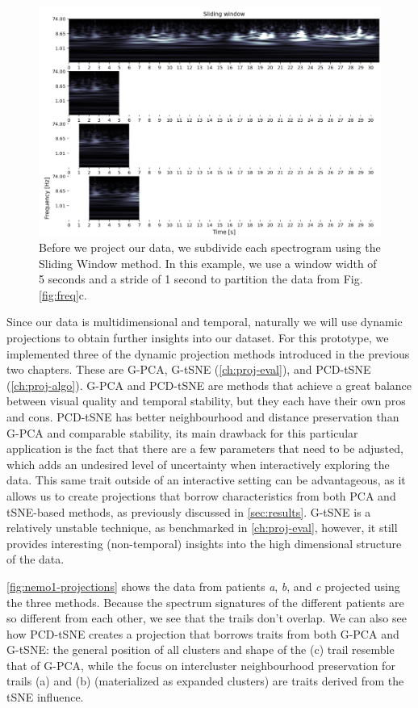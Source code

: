 \begin{figure}[ht]
\centering
\includegraphics[width=\linewidth]{figures/nemo/sliding.png}
\caption{Before we project our data, we subdivide each spectrogram using the Sliding Window method. In this example, we use a window width of 5 seconds and a stride of 1 second to partition the data from Fig. \ref{fig:freq}c.}
\label{fig:sliding}
\end{figure}

Since our data is multidimensional and temporal, naturally we will use dynamic projections to obtain further insights into our dataset.
For this prototype, we implemented three of the dynamic projection methods introduced in the previous two chapters. These are G-PCA, G-tSNE (\cref{ch:proj-eval}), and PCD-tSNE (\cref{ch:proj-algo}). 
G-PCA and PCD-tSNE are methods that achieve a great balance between visual quality and temporal stability, but they each have their own pros and cons. PCD-tSNE has better neighbourhood and distance preservation than G-PCA and comparable stability, its main drawback for this particular application is the fact that there are a few parameters that need to be adjusted, which adds an undesired level of uncertainty when interactively exploring the data. This same trait outside of an interactive setting can be advantageous, as it allows us to create projections that borrow characteristics from both PCA and tSNE-based methods, as previously discussed in \cref{sec:results}. %
G-tSNE is a relatively unstable technique, as benchmarked in \cref{ch:proj-eval}, however, it still provides interesting (non-temporal) insights into the high dimensional structure of the data.

\cref{fig:nemo1-projections} shows the data from patients \textit{a}, \textit{b}, and \textit{c} projected using the three methods. Because the spectrum signatures of the different patients are so different from each other, we see that the trails don't overlap. We can also see how PCD-tSNE creates a projection that borrows traits from both G-PCA and G-tSNE: the general position of all clusters and shape of the (c) trail resemble that of G-PCA, while the focus on intercluster neighbourhood preservation for trails (a) and (b) (materialized as expanded clusters) are traits derived from the tSNE influence.

